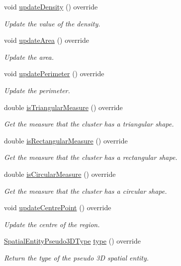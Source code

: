 \begin{DoxyCompactItemize}
void \hyperlink{classmultiscale_1_1analysis_1_1Region_a995bd4ac0452715ec75bdb8c6ae51914}{update\-Density} () override
\begin{DoxyCompactList}\small\item\em \-Update the value of the density. \end{DoxyCompactList}\item 
void \hyperlink{classmultiscale_1_1analysis_1_1Region_a88adaf10fae7c554581498f86f1863fa}{update\-Area} () override
\begin{DoxyCompactList}\small\item\em \-Update the area. \end{DoxyCompactList}\item 
void \hyperlink{classmultiscale_1_1analysis_1_1Region_a58a4a22cb77fc6963592ec156458f310}{update\-Perimeter} () override
\begin{DoxyCompactList}\small\item\em \-Update the perimeter. \end{DoxyCompactList}\item 
double \hyperlink{classmultiscale_1_1analysis_1_1Region_acb88d149b42eee5225e7197a225d31c3}{is\-Triangular\-Measure} () override
\begin{DoxyCompactList}\small\item\em \-Get the measure that the cluster has a triangular shape. \end{DoxyCompactList}\item 
double \hyperlink{classmultiscale_1_1analysis_1_1Region_a2310c3e3c6f1dea310e14e46d466a204}{is\-Rectangular\-Measure} () override
\begin{DoxyCompactList}\small\item\em \-Get the measure that the cluster has a rectangular shape. \end{DoxyCompactList}\item 
double \hyperlink{classmultiscale_1_1analysis_1_1Region_aa59dcbe337f4db849d66cb3902617ccd}{is\-Circular\-Measure} () override
\begin{DoxyCompactList}\small\item\em \-Get the measure that the cluster has a circular shape. \end{DoxyCompactList}\item 
void \hyperlink{classmultiscale_1_1analysis_1_1Region_a3753b8789a73c1e3b5d189aa710aec86}{update\-Centre\-Point} () override
\begin{DoxyCompactList}\small\item\em \-Update the centre of the region. \end{DoxyCompactList}\item 
\hyperlink{namespacemultiscale_1_1analysis_a8f337e7ea9c75ff3ff2b3fe76fe7b5b6}{\-Spatial\-Entity\-Pseudo3\-D\-Type} \hyperlink{classmultiscale_1_1analysis_1_1Region_a7cac0117120ae96e40f5c7eec8266922}{type} () override
\begin{DoxyCompactList}\small\item\em \-Return the type of the pseudo 3\-D spatial entity. \end{DoxyCompactList}\end{DoxyCompactItemize}

